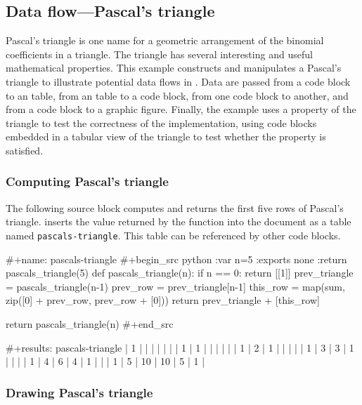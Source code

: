 \documentclass[article,shortnames]{jss}
\begin{document}
\subsection{Data flow---Pascal's triangle}
\label{sec-4-1}
\label{pascals-triangle}


Pascal's triangle is one name for a geometric arrangement of the
binomial coefficients in a triangle.  The triangle has several
interesting and useful mathematical properties.  This example
constructs and manipulates a Pascal's triangle to illustrate potential
data flows in .  Data are passed from a code block to an
 table, from an  table to a code block, from one code
block to another, and from a code block to a graphic figure.  Finally,
the example uses a property of the triangle to test the correctness of
the implementation, using  code blocks embedded in a tabular
view of the triangle to test whether the property is satisfied.
\subsubsection{Computing Pascal's triangle}
\label{sec-4-1-1}

The following  source block computes and returns the first
five rows of Pascal's triangle.   inserts the value returned
by the  function into the  document as a table named
\texttt{pascals-triangle}.  This table can be referenced by other code
blocks.

\begin{Code}
#+name: pascals-triangle
#+begin_src python :var n=5 :exports none :return pascals_triangle(5)
  def pascals_triangle(n):
      if n == 0:
          return [[1]]
      prev_triangle = pascals_triangle(n-1)
      prev_row = prev_triangle[n-1]
      this_row = map(sum, zip([0] + prev_row, prev_row + [0]))
      return prev_triangle + [this_row]
  
  return pascals_triangle(n)
#+end_src

#+results: pascals-triangle
| 1 |   |    |    |   |   |
| 1 | 1 |    |    |   |   |
| 1 | 2 |  1 |    |   |   |
| 1 | 3 |  3 |  1 |   |   |
| 1 | 4 |  6 |  4 | 1 |   |
| 1 | 5 | 10 | 10 | 5 | 1 |
\end{Code}
\subsubsection{Drawing Pascal's triangle}
\label{sec-4-1-2}
\end{document}
